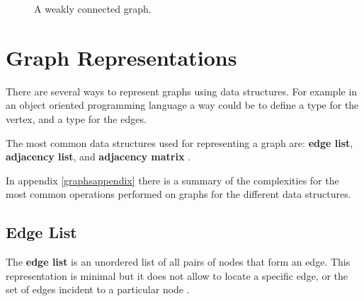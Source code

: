 \begin{figure}[H]
\centering
{}  
\caption[A weakly connected graph.]{A weakly connected graph.}
\label{graphs_2}
\end{figure}

\section{Graph Representations}
There are several ways to represent graphs using data structures. For example in an object oriented programming language a way could be to define a type for the vertex, and a type for the edges.

The most common data structures used for representing a graph are: \textbf{edge list}, \textbf{adjacency list}, and \textbf{adjacency matrix} \cite{goodrich2013data}. 

In appendix \ref{graphsappendix} there is a summary of the complexities for the most common operations performed on graphs for the different data structures.

\subsection{Edge List}
The \textbf{edge list} is an unordered list of all pairs of nodes that form an edge. This representation is minimal but it does not allow to locate a specific edge, or the set of edges incident to a particular node \cite{goodrich2013data}.

